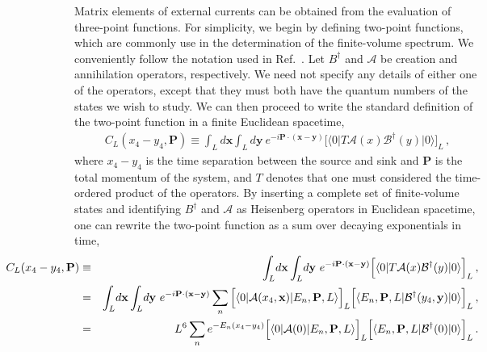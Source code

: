 \documentclass{iopart}
\theoremstyle{definition}
\newcommand{\nn}{\nonumber}
\begin{document}
{Matrix elements of external currents can be obtained from the evaluation of three-point functions. For simplicity, we begin by defining two-point functions, which are commonly use in the determination of the finite-volume spectrum. We conveniently follow the notation used in Ref.~\cite{Briceno:2015tza}. Let $B^\dagger$ and $\mathcal A$ be creation and annihilation operators, respectively.  We need not specify any details of either one of the operators, except that they must both have the quantum numbers of the states we wish to study. We can then proceed to write the standard definition of the two-point function in a finite Euclidean spacetime,
\begin{eqnarray}
C_L(x_4-y_4, \mathbf P)   \equiv \int_L \! d \mathbf x \int_L \! d \mathbf y \ e^{- i \mathbf P \cdot (\mathbf x - \mathbf y)} \Big [ \langle 0 \vert T \mathcal A(x) \mathcal B^\dagger(y) \vert 0 \rangle \Big ]_L \,,
\label{eq:two-point}
\end{eqnarray}
 where $x_4-y_4$ is the time separation between the source and sink and $\mathbf P$ is the total momentum of the system, and $T$ denotes that one must considered the time-ordered product of the operators. By inserting a complete set of finite-volume states and identifying $B^\dagger$ and $\mathcal A$ as Heisenberg operators in Euclidean spacetime, one can rewrite the two-point function as a sum over decaying exponentials in time,
 \begin{eqnarray}
\hspace{-2.2cm}
C_L(x_4-y_4, \mathbf P) & \equiv& \int_L \! d \mathbf x \int_L \! d \mathbf y \ e^{- i \mathbf P \cdot (\mathbf x - \mathbf y)} \Big [ \langle 0 \vert T \mathcal A(x) \mathcal B^\dagger(y) \vert 0 \rangle \Big ]_L \,, \nn\\
& =& \int_L \! d \mathbf x \int_L \! d \mathbf y \ e^{- i \mathbf P \cdot (\mathbf x - \mathbf y)} \sum_n \Big [ \langle 0 \vert \mathcal A(x_4, \mathbf x)  \vert E_n, \mathbf P, L \rangle \Big ]_L \Big [ \langle E_n, \mathbf P, L \vert \mathcal B^\dagger(y_4, \mathbf y) \vert 0 \rangle \Big ]_L\,, \nn\\
& =&  L^6 \sum_n e^{- E_{n}(x_4-y_4)}   \Big [ \langle 0 \vert  \mathcal A(0)  \vert E_n, \mathbf P, L \rangle \Big ]_L \Big [ \langle E_n, \mathbf P, L \vert \mathcal B^\dagger(0) \vert 0 \rangle \Big ]_L \,.

\end{eqnarray}}
\end{document}
